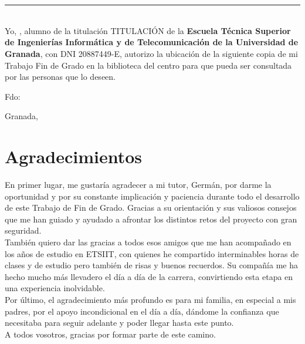 \section*{}
\thispagestyle{empty}

\noindent\rule[-1ex]{\textwidth}{2pt}\\[4.5ex]

Yo, \textbf{\myName}, alumno de la titulación TITULACIÓN de la \textbf{Escuela Técnica Superior
de Ingenierías Informática y de Telecomunicación de la Universidad de Granada}, con DNI 20887449-E, autorizo la ubicación de la siguiente copia de mi Trabajo Fin de Grado en la biblioteca del centro para que pueda ser consultada por las personas que lo deseen.
\vspace{6cm}

\noindent Fdo: \myName
\vspace{2cm}

\begin{flushright}
Granada, \myTime
\end{flushright}


\cleardoublepage
\thispagestyle{empty}

%

\cleardoublepage


\section*{Agradecimientos}
\thispagestyle{empty}

\vspace{1cm}

En primer lugar, me gustaría agradecer a mi tutor, Germán, por darme la oportunidad y por su constante implicación y paciencia durante todo el desarrollo de este Trabajo de Fin de Grado. Gracias a su orientación y sus valiosos consejos que me han guiado y ayudado a afrontar los distintos retos del proyecto con gran seguridad.\\

También quiero dar las gracias a todos esos amigos que me han acompañado en los años de estudio en ETSIIT, con quienes he compartido interminables horas de clases y de estudio pero también de risas y buenos recuerdos. Su compañía me ha hecho mucho más llevadero el día a día de la carrera, convirtiendo esta etapa en una experiencia inolvidable.\\

Por último, el agradecimiento más profundo es para mi familia, en especial a mis padres, por el apoyo incondicional en el día a día, dándome la confianza que necesitaba para seguir adelante y poder llegar hasta este punto. \\

A todos vosotros, gracias por formar parte de este camino.

\cleardoublepage